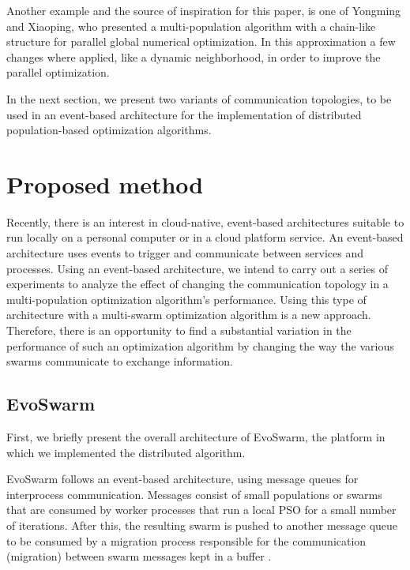 \documentclass[runningheads]{llncs}
\begin{document}
Another example and the source of inspiration for this paper, is one
of Yongming and Xiaoping, %
who presented a multi-population algorithm with a chain-like structure for parallel global
numerical optimization. In this approximation a few changes where applied, like a dynamic neighborhood,
in order to improve the parallel optimization\cite{b17}.


In the next section, we present two variants of communication topologies,
to be used in an event-based architecture for the implementation of 
distributed population-based optimization algorithms.


\section{Proposed method}

Recently, there is an interest in cloud-native, event-based architectures
suitable to run locally on a personal computer or in a cloud platform service.
An event-based architecture uses events to trigger and communicate between
services and processes. Using an event-based architecture, we intend to carry
out a series of experiments to analyze the effect of changing the communication
topology in a multi-population optimization algorithm's performance. Using this
type of architecture with a multi-swarm optimization algorithm is a new
approach. Therefore, there is an opportunity to find a substantial variation in
the performance of such an optimization algorithm by changing the way the
various swarms communicate to exchange information.

\subsection{EvoSwarm}

First, we briefly present the overall architecture of EvoSwarm, the
platform in which we implemented the distributed algorithm.

EvoSwarm follows an event-based architecture, using message queues for
interprocess communication. Messages consist of small populations or swarms that
are consumed by worker processes that run a local PSO for a small number of
iterations. After this, the resulting swarm is pushed to another message queue
to be consumed by a migration process responsible for the communication
(migration) between swarm messages kept in a buffer \cite{b18}.
\end{document}
